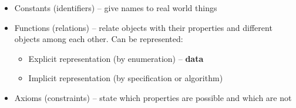 \begin{itemize}
	\begin{itemize}
		\item Constants (identifiers) -- give names to real world things
		\item Functions (relations) -- relate objects with their properties and different objects among each other. Can be represented:
		\begin{itemize}
			\item Explicit representation (by enumeration) -- \textbf{data}
			\item Implicit representation (by specification or algorithm)
		\end{itemize}
		\item Axioms (constraints) -- state which properties are possible and which are not
	\end{itemize}
\end{itemize}